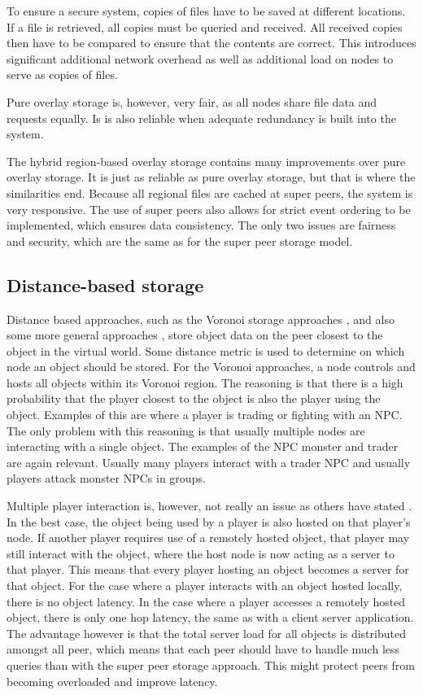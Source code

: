 \documentclass[journal,oneside,a4paper,onecolumn]{IEEEtran}
\begin{document}
To ensure a secure system, copies of files have to be saved at different locations. If a file is retrieved, all copies must be queried and received. All received copies then have to be compared to ensure that the contents are correct. This introduces significant additional network overhead as well as additional load on nodes to serve as copies of files.

Pure overlay storage is, however, very fair, as all nodes share file data and requests equally. Is is also reliable when adequate redundancy is built into the system.

The hybrid region-based overlay storage contains many improvements over pure overlay storage. It is just as reliable as pure overlay storage, but that is where the similarities end. Because all regional files are cached at super peers, the system is very responsive. The use of super peers also allows for strict event ordering to be implemented, which ensures data consistency. The only two issues are fairness and security, which are the same as for the super peer storage model.

\subsection{Distance-based storage}

Distance based approaches, such as the Voronoi storage approaches \cite{Buyukkaya_voronoi_state_management}, \cite{Hu_voronoi_IM} and also some more general approaches \cite{colyseus_distance_based}, store object data on the peer closest to the object in the virtual world. Some distance metric is used to determine on which node an object should be stored. For the Voronoi approaches, a node controls and hosts all objects within its Voronoi region. The reasoning is that there is a high probability that the player closest to the object is also the player using the object. Examples of this are where a player is trading or fighting with an NPC. The only problem with this reasoning is that usually multiple nodes are interacting with a single object. The examples of the NPC monster and trader are again relevant. Usually many players interact with a trader NPC and usually players attack monster NPCs in groups.

Multiple player interaction is, however, not really an issue as others have stated \cite{Fan_deisgn_issues_p2p}. In the best case, the object being used by a player is also hosted on that player's node. If another player requires use of a remotely hosted object, that player may still interact with the object, where the host node is now acting as a server to that player. This means that every player hosting an object becomes a server for that object. For the case where a player interacts with an object hosted locally, there is no object latency. In the case where a player accesses a remotely hosted object, there is only one hop latency, the same as with a client server application. The advantage however is that the total server load for all objects is distributed amongst all peer, which means that each peer should have to handle much less queries than with the super peer storage approach. This might protect peers from becoming overloaded and improve latency.
\end{document}
